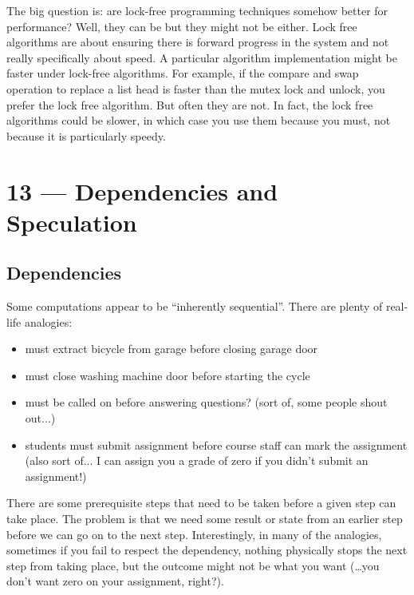 \documentclass[a4paper]{report}
\begin{document}
The big question is: are lock-free programming techniques somehow better for performance? Well, they can be but they might not be either. Lock free algorithms are about ensuring there is forward progress in the system and not really specifically about speed. A particular algorithm implementation might be faster under lock-free algorithms. For example, if the compare and swap operation to replace a list head is faster than the mutex lock and unlock, you prefer the lock free algorithm. But often they are not. In fact, the lock free algorithms could be slower, in which case you use them because you must, not because it is particularly speedy.









\chapter*{13 --- Dependencies and Speculation}


\section*{Dependencies}
Some computations appear to be ``inherently sequential''. There are plenty of real-life analogies:

\begin{itemize}
\item must extract bicycle from garage before closing garage door
 
\item must close washing machine door before starting the cycle
 
\item must be called on before answering questions? (sort of, some people shout out...)
 
\item students must submit assignment before course staff can mark the assignment (also sort of... I can assign you a grade of zero if you didn't submit an assignment!)
\end{itemize}

There are some prerequisite steps that need to be taken before a given step can take place. The problem is that we need some result or state from an earlier step before we can go on to the next step. Interestingly, in many of the analogies, sometimes if you fail to respect the dependency, nothing physically stops the next step from taking place, but the outcome might not be what you want (\ldots you don't want zero on your assignment, right?).
\end{document}
